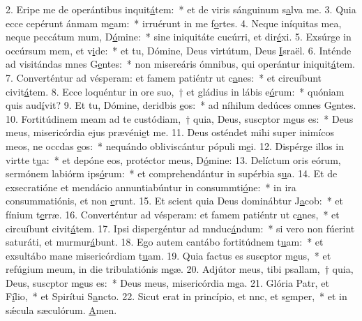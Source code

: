 2. Eripe me de operántibus inquit\uline{á}tem:~* et de viris sánguinum s\uline{a}lva me.
3. Quia ecce cepérunt ánmam m\uline{e}am:~* irruérunt in me f\uline{o}rtes.
4. Neque iníquitas mea, neque peccátum mum, D\uline{ó}mine:~* sine iniquitáte cucúrri, et dir\uline{é}xi.
5. Exsúrge in occúrsum mem, et v\uline{i}de:~* et tu, Dómine, Deus virtútum, Deus \uline{I}sraël.
6. Inténde ad visitándas mnes G\uline{e}ntes:~* non misereáris ómnibus, qui operántur iniquit\uline{á}tem.
7. Converténtur ad vésperam: et famem patiéntr ut c\uline{a}nes:~* et circuíbunt civit\uline{á}tem.
8. Ecce loquéntur in ore suo,~† et gládius in lábis e\uline{ó}rum:~* quóniam quis aud\uline{í}vit?
9. Et tu, Dómine, deridbis \uline{e}os:~* ad níhilum dedúces omnes G\uline{e}ntes.
10. Fortitúdinem meam ad te custódiam,~† quia, Deus, suscptor m\uline{e}us es:~* Deus meus, misericórdia ejus prævéni\uline{e}t me.
11. Deus osténdet mihi super inimícos meos, ne occdas \uline{e}os:~* nequándo obliviscántur pópuli m\uline{e}i.
12. Dispérge illos in virtte t\uline{u}a:~* et depóne eos, protéctor meus, D\uline{ó}mine:
13. Delíctum oris eórum, sermónem labiórm ips\uline{ó}rum:~* et comprehendántur in supérbia s\uline{u}a.
14. Et de exsecratióne et mendácio annuntiabúntur in consummti\uline{ó}ne:~* in ira consummatiónis, et non \uline{e}runt.
15. Et scient quia Deus dominábtur J\uline{a}cob:~* et fínium t\uline{e}rræ.
16. Converténtur ad vésperam: et famem patiéntr ut c\uline{a}nes,~* et circuíbunt civit\uline{á}tem.
17. Ipsi dispergéntur ad mnduc\uline{á}ndum:~* si vero non fúerint saturáti, et murmur\uline{á}bunt.
18. Ego autem cantábo fortitúdnem t\uline{u}am:~* et exsultábo mane misericórdiam t\uline{u}am.
19. Quia factus es suscptor m\uline{e}us,~* et refúgium meum, in die tribulatiónis m\uline{e}æ.
20. Adjútor meus, tibi psallam,~† quia, Deus, suscptor m\uline{e}us es:~* Deus meus, misericórdia m\uline{e}a.
21. Glória Patr, et F\uline{í}lio,~* et Spirítui S\uline{a}ncto.
22. Sicut erat in princípio, et nnc, et s\uline{e}mper,~* et in sǽcula sæculórum. \uline{A}men.

